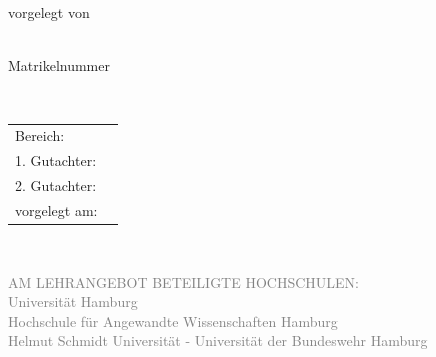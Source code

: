 \begin{titlepage}
\begin{minipage}[l][5.0cm][t]{\textwidth}
\begin{center}
		{\Huge
			\textcolor{hwiFarbe}{\thesistype{}} %
		} \\	[\baselineskip]
	

		{\Large %
			\thesistitle			} \\[\baselineskip]
			
		vorgelegt von
		
		{\large %

			\student \\
			Matrikelnummer \studentnumber
		} \\
	\end{center}
\end{minipage}



\vfill %

\begin{tabular}{@{}ll}
	Bereich: & \\
	1. Gutachter:  & \firstsupervisor \\	
	2. Gutachter:  & \secondsupervisor \\
	vorgelegt am:  & \thesisdate
\end{tabular} \\[-1.0\baselineskip]

\hspace*{.55\linewidth}\begin{minipage}[t][-0.5cm][t]{\textwidth}%
\raggedright
\scriptsize
\singlespacing
\textcolor{gray}{
    \scriptsize
	AM LEHRANGEBOT BETEILIGTE HOCHSCHULEN:\\
	Universität Hamburg\\
	Hochschule für Angewandte Wissenschaften Hamburg\\
    {%
    }
    {%
        Helmut Schmidt Universität - Universität der Bundeswehr Hamburg\\
    }
}
\end{minipage}
\end{titlepage}

